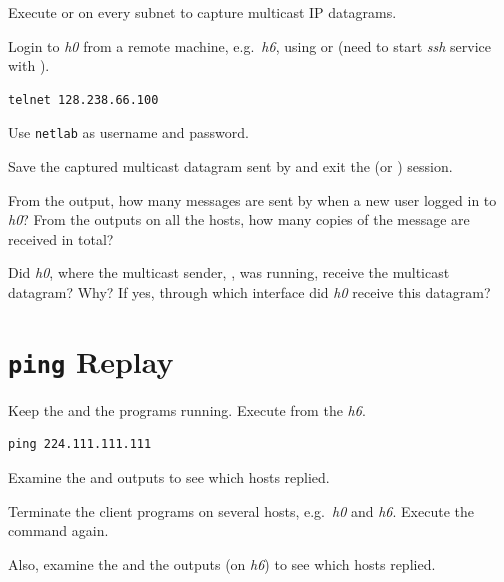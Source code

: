 \documentclass{../UTNetLab}
\begin{document}
Execute  or  on every subnet to capture multicast IP datagrams.

Login to \textit{h0} from a remote machine, e.g.\ \textit{h6}, using  or  (need to start \textit{ssh} service with ).

\begin{lstlisting}
telnet 128.238.66.100
\end{lstlisting}
Use \texttt{netlab} as username and password.

Save the captured multicast datagram sent by  and exit the  (or ) session.

\begin{report}
    \item From the  output, how many messages are sent by  when a new user logged in to \textit{h0}?
    From the  outputs on all the hosts, how many copies of the message are received in total?

    \item Did \textit{h0}, where the multicast sender, , was running, receive the multicast datagram?
    Why?
    If yes, through which interface did \textit{h0} receive this datagram?
\end{report}

\section{\texttt{ping} Replay}
Keep the  and the  programs running.
Execute  from the \textit{h6}.

\begin{lstlisting}
ping 224.111.111.111
\end{lstlisting}
Examine the  and  outputs to see which hosts replied.

Terminate the  client programs on several hosts, e.g.\ \textit{h0} and \textit{h6}.
Execute the  command again.

Also, examine the  and the  outputs (on \textit{h6}) to see which hosts replied.
\end{document}

